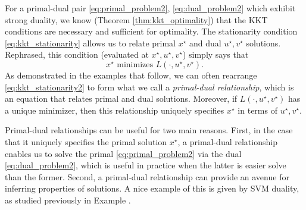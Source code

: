 For a primal-dual pair \eqref{eq:primal_problem2}, \eqref{eq:dual_problem2}
which exhibit strong duality, we know (Theorem \ref{thm:kkt_optimality}) that
the KKT conditions are necessary and sufficient for optimality. The stationarity
condition \eqref{eq:kkt_stationarity} allows us to relate primal $x^\star$ and
dual $u^\star, v^\star$ solutions. Rephrased, this condition (evaluated at
$x^\star,  u^\star, v^\star$) simply says that
\begin{equation}
\label{eq:kkt_stationarity2}
\text{$x^\star$ minimizes $L(\cdot, u^\star, v^\star)$}.
\end{equation}
As demonstrated in the examples that follow, we can often rearrange
\eqref{eq:kkt_stationarity2} to form what we call a \emph{primal-dual
  relationship}, which is an equation that relates primal and dual solutions.
Moreover, if $L(\cdot, u^\star, v^\star)$ has a unique minimizer, then this
relationship uniquely specifies $x^\star$ in terms of $u^\star, v^\star$.     

Primal-dual relationships can be useful for two main reasons. First, in the case
that it uniquely specifies the primal solution $x^\star$, a primal-dual
relationship enables us to solve the primal \eqref{eq:primal_problem2} via the
dual \eqref{eq:dual_problem2}, which is useful in practice when the latter is
easier solve than the former. Second, a primal-dual relationship can provide an
avenue for inferring properties of solutions. A nice example of this is given
by SVM duality, as studied previously in Example . 

